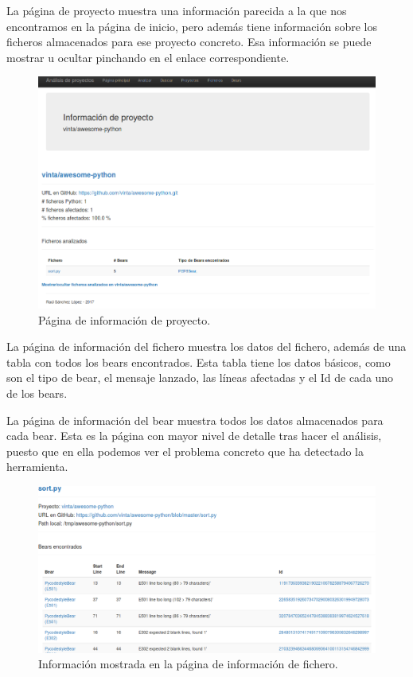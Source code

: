 \documentclass[a4paper, 12pt]{book}
\begin{document}
La página de proyecto muestra una información parecida a la que nos encontramos en la página de inicio, pero además tiene información sobre los ficheros almacenados para ese proyecto concreto. Esa información se puede mostrar u ocultar pinchando en el enlace correspondiente.
\begin{figure}[H]
  \centering
  \includegraphics[width=15cm, keepaspectratio]{img/infoProyecto}
  \caption{Página de información de proyecto.}
  \label{fig:infoProyecto}
\end{figure}

La página de información del fichero muestra los datos del fichero, además de una tabla con todos los bears encontrados. Esta tabla tiene los datos básicos, como son el tipo de bear, el mensaje lanzado, las líneas afectadas y el Id de cada uno de los bears.

La página de información del bear muestra todos los datos almacenados para cada bear. Esta es la página con mayor nivel de detalle tras hacer el análisis, puesto que en ella podemos ver el problema concreto que ha detectado la herramienta.

\begin{figure}[H]
  \centering
  \includegraphics[width=16cm, keepaspectratio]{img/infoFichero}
  \caption{Información mostrada en la página de información de fichero.}
  \label{fig:infoFichero}
\end{figure}
\end{document}
